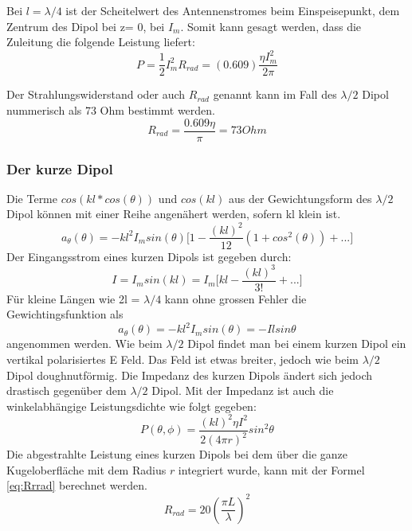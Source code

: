 Bei $l=\lambda/4 $ ist der Scheitelwert des Antennenstromes beim Einspeisepunkt, dem Zentrum des Dipol bei z= 0, bei $I_{m}$. Somit kann gesagt werden, dass die Zuleitung  die folgende Leistung  liefert:
\begin{equation}
P=\frac{1}{2} I_{m}^{2}R_{rad}=(0.609)\frac{\eta I_{m}^{2}}{2\pi}
\end{equation}

Der Strahlungswiderstand oder auch $R_{rad}$ genannt kann im Fall des $\lambda /2$ Dipol nummerisch als 73 Ohm bestimmt werden.
\begin{equation}\label{RradDipol}
R_{rad}=\frac{0.609 \eta}{\pi}= 73 Ohm
\end{equation}
\subsubsection{Der kurze Dipol }\label{sec:kurzerDipol}
Die Terme $cos(kl*cos(\theta)) $ und $cos(kl)$ aus der Gewichtungsform des $\lambda/2$ Dipol können mit einer Reihe angenähert werden, sofern kl klein ist.
\begin{equation}
a_{\theta}(\theta)=-kl^{2}I_{m}sin(\theta) \lbrack 1- \frac{(kl)^{2}}{12}(1+cos^{2}(\theta))+...\rbrack
\end{equation}
Der Eingangsstrom eines kurzen Dipols ist gegeben durch:
\begin{equation}
I=I_{m}sin(kl)=I_{m}\lbrack kl - \frac{(kl)^{3}}{3!} +... \rbrack
\end{equation}
 Für kleine Längen wie 2l = $\lambda/4 $ kann ohne grossen Fehler die Gewichtingsfunktion als 
\begin{equation}
a_{\theta}(\theta)=-kl^{2}I_{m}sin(\theta)=-Ilsin\theta
\end{equation}
angenommen werden.
Wie beim $\lambda/2$ Dipol findet man bei einem kurzen Dipol ein vertikal polarisiertes E Feld. Das Feld ist etwas breiter,  jedoch wie beim $\lambda/2$ Dipol doughnutförmig. Die Impedanz des kurzen Dipols ändert sich jedoch drastisch gegenüber dem $\lambda/2$ Dipol. Mit der Impedanz ist auch die winkelabhängige Leistungsdichte wie folgt gegeben:
\begin{equation}
P(\theta,\phi)=\frac{(kl)^{2}\eta I^{2}}{2(4\pi r)^{2}}sin^{2}\theta
\end{equation}
Die abgestrahlte Leistung eines kurzen Dipols bei dem über die ganze Kugeloberfläche mit dem Radius $r$ integriert wurde, kann mit der Formel \ref{eq:Rrrad} berechnet werden.
\begin{equation}\label{eq:Rrrad}
R_{rad}=20 \left(\frac{\pi L}{\lambda} \right) ^{2}
\end{equation}



